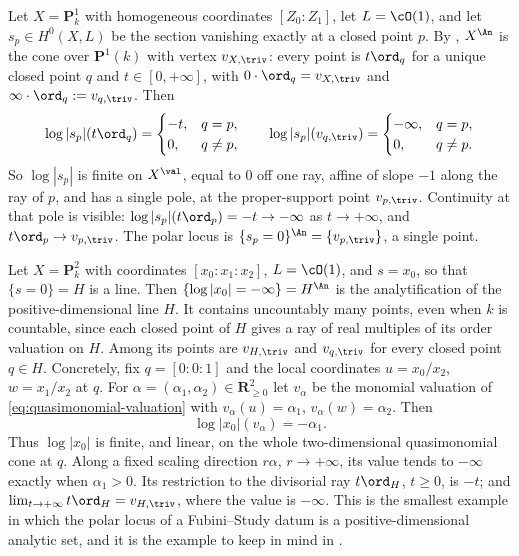 \begin{example}
\label{ex:ch34-log-s-p1}
Let $X=\mathbf P^1_k$ with homogeneous coordinates $[Z_0:Z_1]$, let
$L=\cO(1)$, and let $s_p\in H^0(X,L)$ be the section vanishing exactly
at a closed point $p$.  By , $X^{\An}$ is the cone
over $\mathbf P^1(k)$ with vertex $v_{X,\triv}$: every point is
$t\ord_q$ for a unique closed point $q$ and $t\in[0,+\infty]$, with
$0\cdot\ord_q=v_{X,\triv}$ and $\infty\cdot\ord_q:=v_{q,\triv}$.  Then
\[
 \log|s_p|(t\ord_q)=
 \begin{cases}
 -t,&q=p,\\
 0,&q\ne p,
 \end{cases}
 \qquad
 \log|s_p|(v_{q,\triv})=
 \begin{cases}
 -\infty,&q=p,\\
 0,&q\ne p .
 \end{cases}
\]
So $\log|s_p|$ is finite on $X^{\val}$, equal to $0$ off one ray,
affine of slope $-1$ along the ray of $p$, and has a single pole, at the
proper-support point $v_{p,\triv}$.  Continuity at that pole is visible:
$\log|s_p|(t\ord_p)=-t\to-\infty$ as $t\to+\infty$, and
$t\ord_p\to v_{p,\triv}$.  The polar locus is
$\{s_p=0\}^{\An}=\{v_{p,\triv}\}$, a single point.
\end{example}

\begin{example}
\label{ex:ch34-log-s-p2}
Let $X=\mathbf P^2_k$ with coordinates $[x_0:x_1:x_2]$, $L=\cO(1)$,
and $s=x_0$, so that $\{s=0\}=H$ is a line.  Then
$\{\log|x_0|=-\infty\}=H^{\An}$ is the analytification of the
positive-dimensional line $H$.  It contains uncountably many points,
even when $k$ is countable, since each closed point of $H$ gives a
ray of real multiples of its order valuation on $H$.
Among its points are
$v_{H,\triv}$ and $v_{q,\triv}$ for every closed point $q\in H$.
Concretely, fix $q=[0:0:1]$ and the local coordinates
$u=x_0/x_2$, $w=x_1/x_2$ at $q$.  For
$\alpha=(\alpha_1,\alpha_2)\in\mathbf R_{\ge0}^2$ let $v_\alpha$ be the
monomial valuation of \eqref{eq:quasimonomial-valuation} with
$v_\alpha(u)=\alpha_1$, $v_\alpha(w)=\alpha_2$.  Then
\[
 \log|x_0|(v_\alpha)=-\alpha_1 .
\]
Thus $\log|x_0|$ is finite, and linear, on the whole two-dimensional
quasimonomial cone at $q$.  Along a fixed scaling direction
$r\alpha$, $r\to+\infty$, its value tends to $-\infty$ exactly when
$\alpha_1>0$.  Its restriction to the divisorial ray
$t\ord_H$, $t\ge0$, is $-t$; and
$\lim_{t\to+\infty}t\ord_H=v_{H,\triv}$, where the value is $-\infty$.
This is the smallest example in which the polar locus of a Fubini--Study
datum is a positive-dimensional analytic set, and it is the example to keep
in mind in .
\end{example}

